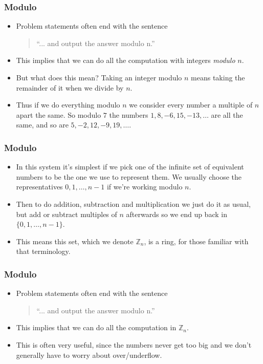 \documentclass{beamer}
\begin{document}
\begin{frame}
  \frametitle{Modulo}
  \vspace{30pt}
  \begin{itemize}
    \item Problem statements often end with the sentence \\
      \vspace{10pt}
      \begin{quote}
``... and output the answer modulo n.''
      \end{quote}
      \vspace{10pt}
    \item This implies that we can do all the computation with integers \emph{modulo }$n$.
    \item But what does this mean? Taking an integer modulo $n$ means taking the remainder of it when we divide by $n$.
    \item Thus if we do everything modulo $n$ we consider every number a multiple of $n$ apart the same. So modulo $7$ the numbers $1, 8, -6, 15, -13, \dots$ are all the same, and so are $5, -2, 12, -9, 19, \dots$.
  \end{itemize}
\end{frame}

\begin{frame}
  \frametitle{Modulo}
  \begin{itemize}
  \item In this system it's simplest if we pick one of the infinite set of equivalent numbers to be the one we use to represent them. We usually choose the representatives $0, 1, \dots, n - 1$ if we're working modulo $n$.
  \item<2-> Then to do addition, subtraction and multiplication we just do it as usual, but add or subtract multiples of $n$ afterwards so we end up back in $\{0, 1, \dots, n - 1\}$.
  \item<3-> This means this set, which we denote $\mathbb{Z}_n$, is a ring, for those familiar with that terminology.
  \end{itemize}
\end{frame}

\begin{frame}
  \frametitle{Modulo}
  \vspace{30pt}
  \begin{itemize}
    \item Problem statements often end with the sentence \\
      \vspace{10pt}
      \begin{quote}
``... and output the answer modulo n.''
      \end{quote}
      \vspace{10pt}
    \item This implies that we can do all the computation in $\mathbb{Z}_n$.
    \item This is often very useful, since the numbers never get too big and we don't generally have to worry about over/underflow.
  \end{itemize}
\end{frame}
\end{document}

